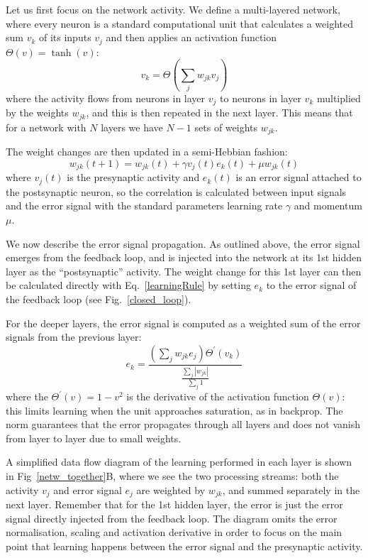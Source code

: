 \documentclass{aamas2018}
\begin{document}
Let us first focus on the network activity. We define a multi-layered
network, where every neuron is a standard computational unit that
calculates a weighted sum $v_k$ of its inputs $v_j$ and then applies
an activation function $\Theta(v) = \tanh(v)$:
\begin{equation}
  v_k = \Theta\left( \sum_j w_{jk} v_{j} \right) \label{act_sum}
\end{equation}
where the activity flows from neurons in layer $v_j$ to neurons in
layer $v_k$ multiplied by the weights $w_{jk}$, and this
is then repeated in the next layer. This means that for a network with
$N$ layers we have $N-1$ sets of weights $w_{jk}$.

The weight changes are then updated in a semi-Hebbian fashion:
\begin{equation}
  w_{jk}(t+1) = w_{jk}(t) + \gamma v_j(t)  e_k(t) + \mu w_{jk}(t) \label{learningRule}
\end{equation}
where $v_j(t)$ is the presynaptic activity and $e_k(t)$ is an error
signal attached to the postsynaptic neuron, so the correlation is
calculated between input signals and the error signal with the
standard parameters learning rate $\gamma$ and momentum $\mu$.

We now describe the error signal propagation. As outlined above, the
error signal emerges from the feedback loop, and is injected into the
network at its 1st hidden layer as the ``postsynaptic'' activity. The
weight change for this 1st layer can then be calculated directly with
Eq.~\ref{learningRule} by setting $e_k$ to the error signal of the
feedback loop (see Fig.~\ref{closed_loop}).

For the deeper layers, the error signal is computed as a weighted
sum of the error signals from the previous layer:
\begin{equation}
  e_k = \frac{\left( \sum_j w_{jk} e_{j} \right) \Theta^\prime (v_k) }{\frac{\sum_j {|w_{jk}|}}{\sum_j 1}}
  \label{deepError}
\end{equation}
where the $\Theta^\prime (v) = 1 - v^2$ is the derivative of the
activation function $\Theta(v)$: this limits learning when the unit
approaches saturation, as in backprop. The norm guarantees that
the error propagates through all layers and does not vanish from
layer to layer due to small weights.

A simplified data flow diagram of the learning performed in each layer
is shown in Fig~\ref{netw_together}B, where we see the two processing
streams: both the activity $v_j$ and error signal $e_j$ are weighted
by $w_{jk}$, and summed separately in the next layer. Remember that
for the 1st hidden layer, the error is just the error signal
directly injected from the feedback loop. The diagram omits the error
normalisation, scaling and activation derivative in order to focus on
the main point that learning happens between the error signal and the
presynaptic activity.
\end{document}
